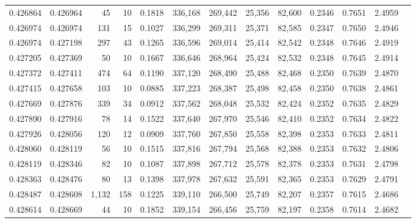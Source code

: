 \begin{tabular}{rrrrrrrrrrrrr}
0.426864 & 0.426964 &    45 &  10 &                                     0.1818 & 336,168 & 269,442 &  25,356 &  82,600 & 0.2346 & 0.7651 & 2.4959 \\
0.426974 & 0.426974 &   131 &  15 &                                     0.1027 & 336,299 & 269,311 &  25,371 &  82,585 & 0.2347 & 0.7650 & 2.4946 \\
0.426974 & 0.427198 &   297 &  43 &                                     0.1265 & 336,596 & 269,014 &  25,414 &  82,542 & 0.2348 & 0.7646 & 2.4919 \\
0.427205 & 0.427369 &    50 &  10 &                                     0.1667 & 336,646 & 268,964 &  25,424 &  82,532 & 0.2348 & 0.7645 & 2.4914 \\
0.427372 & 0.427411 &   474 &  64 &                                     0.1190 & 337,120 & 268,490 &  25,488 &  82,468 & 0.2350 & 0.7639 & 2.4870 \\
0.427415 & 0.427658 &   103 &  10 &                                     0.0885 & 337,223 & 268,387 &  25,498 &  82,458 & 0.2350 & 0.7638 & 2.4861 \\
0.427669 & 0.427876 &   339 &  34 &                                     0.0912 & 337,562 & 268,048 &  25,532 &  82,424 & 0.2352 & 0.7635 & 2.4829 \\
0.427890 & 0.427916 &    78 &  14 &                                     0.1522 & 337,640 & 267,970 &  25,546 &  82,410 & 0.2352 & 0.7634 & 2.4822 \\
0.427926 & 0.428056 &   120 &  12 &                                     0.0909 & 337,760 & 267,850 &  25,558 &  82,398 & 0.2353 & 0.7633 & 2.4811 \\
0.428060 & 0.428119 &    56 &  10 &                                     0.1515 & 337,816 & 267,794 &  25,568 &  82,388 & 0.2353 & 0.7632 & 2.4806 \\
0.428119 & 0.428346 &    82 &  10 &                                     0.1087 & 337,898 & 267,712 &  25,578 &  82,378 & 0.2353 & 0.7631 & 2.4798 \\
0.428363 & 0.428476 &    80 &  13 &                                     0.1398 & 337,978 & 267,632 &  25,591 &  82,365 & 0.2353 & 0.7629 & 2.4791 \\
0.428487 & 0.428608 & 1,132 & 158 &                                     0.1225 & 339,110 & 266,500 &  25,749 &  82,207 & 0.2357 & 0.7615 & 2.4686 \\
0.428614 & 0.428669 &    44 &  10 &                                     0.1852 & 339,154 & 266,456 &  25,759 &  82,197 & 0.2358 & 0.7614 & 2.4682 \\

\end{tabular}
